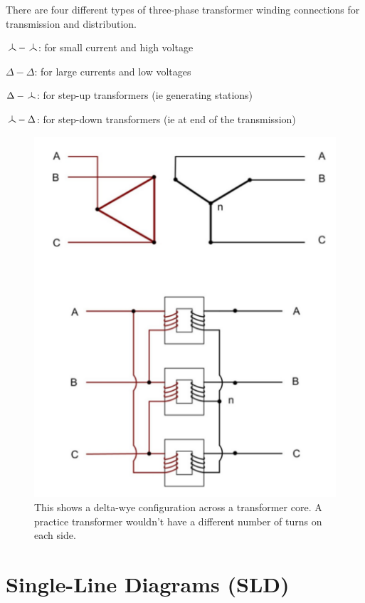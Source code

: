 There are four different types of three-phase transformer winding connections for transmission and distribution.
\begin{pline}
    \item $\wye - \wye$: for small current and high voltage
    \item $\Delta - \Delta$: for large currents and low voltages
    \item $\Delta - \wye$: for step-up transformers (ie generating stations)
    \item $\wye - \Delta$: for step-down transformers (ie at end of the transmission)
\end{pline}

\begin{figure}[H]
    \centering
    \includegraphics[scale=0.5]{figs/ch03/Delta-Wye_Transformer.png}
    \caption{This shows a delta-wye configuration across a transformer core. A practice transformer wouldn't have a different number of turns on each side.}
\end{figure}

\section{Single-Line Diagrams (SLD)}

